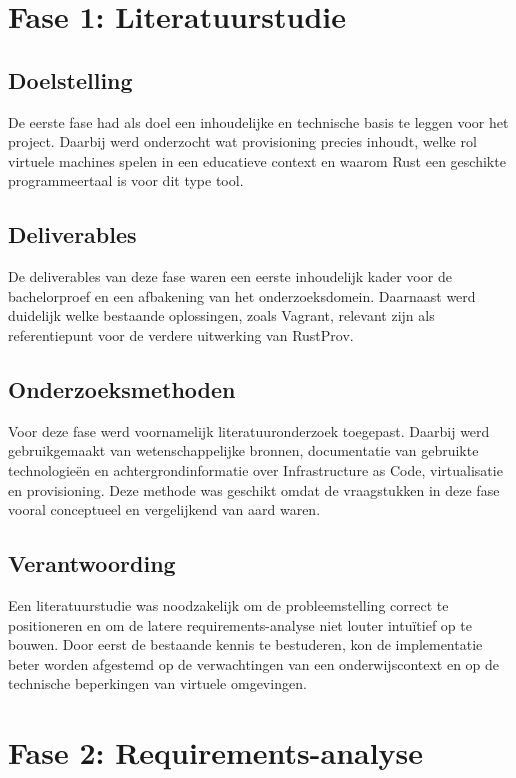\section{Fase 1: Literatuurstudie}

\subsection{Doelstelling}

De eerste fase had als doel een inhoudelijke en technische basis te leggen voor het project. Daarbij werd onderzocht wat provisioning precies inhoudt, welke rol virtuele machines spelen in een educatieve context en waarom Rust een geschikte programmeertaal is voor dit type tool. 

\subsection{Deliverables}

De deliverables van deze fase waren een eerste inhoudelijk kader voor de bachelorproef en een afbakening van het onderzoeksdomein. Daarnaast werd duidelijk welke bestaande oplossingen, zoals Vagrant, relevant zijn als referentiepunt voor de verdere uitwerking van RustProv. 

\subsection{Onderzoeksmethoden}

Voor deze fase werd voornamelijk literatuuronderzoek toegepast. Daarbij werd gebruikgemaakt van wetenschappelijke bronnen, documentatie van gebruikte technologieën en achtergrondinformatie over Infrastructure as Code, virtualisatie en provisioning. Deze methode was geschikt omdat de vraagstukken in deze fase vooral conceptueel en vergelijkend van aard waren.

\subsection{Verantwoording}

Een literatuurstudie was noodzakelijk om de probleemstelling correct te positioneren en om de latere requirements-analyse niet louter intuïtief op te bouwen. Door eerst de bestaande kennis te bestuderen, kon de implementatie beter worden afgestemd op de verwachtingen van een onderwijscontext en op de technische beperkingen van virtuele omgevingen. 

\section{Fase 2: Requirements-analyse}

